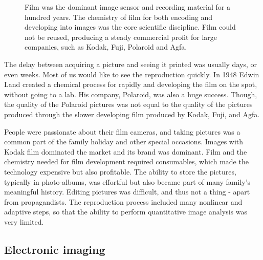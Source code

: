 \documentclass[
  letterpaper,
]{book}
\begin{document}
\begin{figure}


\caption{\label{fig-film}Film was the dominant image sensor and
recording material for a hundred years. The chemistry of film for both
encoding and developing into images was the core scientific discipline.
Film could not be reused, producing a steady commercial profit for large
companies, such as Kodak, Fuji, Polaroid and Agfa.}

\end{figure}%

The delay between acquiring a picture and seeing it printed was usually
days, or even weeks. Most of us would like to see the reproduction
quickly. In 1948 Edwin Land created a chemical process for rapidly and
developing the film on the spot, without going to a lab. His company,
Polaroid, was also a huge success. Though, the quality of the Polaroid
pictures was not equal to the quality of the pictures produced through
the slower developing film produced by Kodak, Fuji, and Agfa.

People were passionate about their film cameras, and taking pictures was
a common part of the family holiday and other special occasions. Images
with Kodak film dominated the market and its brand was dominant. Film
and the chemistry needed for film development required consumables,
which made the technology expensive but also profitable. The ability to
store the pictures, typically in photo-albums, was effortful but also
became part of many family's meaningful history. Editing pictures was
difficult, and thus not a thing - apart from propagandists. The
reproduction process included many nonlinear and adaptive steps, so that
the ability to perform quantitative image analysis was very limited.

\subsection*{Electronic imaging}\label{electronic-imaging}
\end{document}
